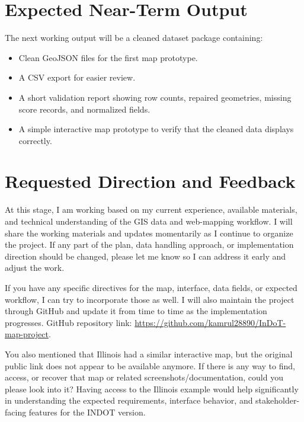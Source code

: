\documentclass[10pt]{article}
\begin{document}
\section{Expected Near-Term Output}

The next working output will be a cleaned dataset package containing:

\begin{itemize}
  \item Clean GeoJSON files for the first map prototype.
  \item A CSV export for easier review.
  \item A short validation report showing row counts, repaired geometries, missing score records, and normalized fields.
  \item A simple interactive map prototype to verify that the cleaned data displays correctly.
\end{itemize}

\section{Requested Direction and Feedback}

At this stage, I am working based on my current experience, available materials,
and technical understanding of the GIS data and web-mapping workflow. I will share
the working materials and updates momentarily as I continue to organize the project.
If any part of the plan, data handling approach, or implementation direction should
be changed, please let me know so I can address it early and adjust the work.

If you have any specific directives for the map, interface, data fields, or expected
workflow, I can try to incorporate those as well. I will also maintain the project
through GitHub and update it from time to time as the implementation progresses.
GitHub repository link: \url{https://github.com/kamrul28890/InDoT-map-project}.

You also mentioned that Illinois had a similar interactive map, but the original
public link does not appear to be available anymore. If there is any way to find,
access, or recover that map or related screenshots/documentation, could you please
look into it? Having access to the Illinois example would help significantly in
understanding the expected requirements, interface behavior, and stakeholder-facing
features for the INDOT version.
\end{document}

